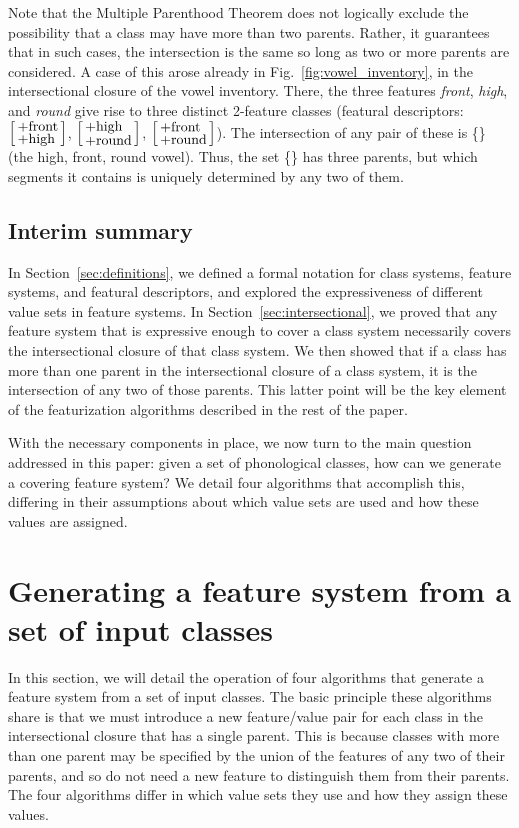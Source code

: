 \documentclass[12pt, oneside]{article}   	%
\newcommand{\featmattwo}[2]{$\begin{bsmallmatrix*}[l]\text{\normalsize #1}\\\text{\normalsize #2}\end{bsmallmatrix*}$}
\begin{document}
\vspace{0.5\baselineskip} Note that the Multiple Parenthood Theorem does not logically exclude the possibility that a class may have more than two parents. Rather, it guarantees that in such cases, the intersection is the same so long as two or more parents are considered. A case of this arose already in Fig.~\ref{fig:vowel_inventory}, in the intersectional closure of the vowel inventory. There, the three features \textit{front}, \textit{high}, and \textit{round} give rise to three distinct 2-feature classes (featural descriptors: \featmattwo{+front}{+high}, \featmattwo{+high}{+round}, \featmattwo{+front}{+round}). The intersection of any pair of these is \{\} (the high, front, round vowel). Thus, the set  \{\} has three parents, but which segments it contains is uniquely determined by any two of them.

\subsection{Interim summary}

In Section~\ref{sec:definitions}, we defined a formal notation for class systems, feature systems, and featural descriptors, and explored the expressiveness of different value sets in feature systems. In Section~\ref{sec:intersectional}, we proved that any feature system that is expressive enough to cover a class system necessarily covers the intersectional closure of that class system. We then showed that if a class has more than one parent in the intersectional closure of a class system, it is the intersection of any two of those parents. This latter point will be the key element of the featurization algorithms described in the rest of the paper.

With the necessary components in place, we now turn to the main question addressed in this paper: given a set of phonological classes, how can we generate a covering feature system? We detail four algorithms that accomplish this, differing in their assumptions about which value sets are used and how these values are assigned.

\FloatBarrier
\section{Generating a feature system from a set of input classes}
\label{sec:algorithm_intro}

In this section, we will detail the operation of four algorithms that generate a feature system from a set of input classes. The basic principle these algorithms share is that we must introduce a new feature/value pair for each class in the intersectional closure that has a single parent. This is because classes with more than one parent may be specified by the union of the features of any two of their parents, and so do not need a new feature to distinguish them from their parents. The four algorithms differ in which value sets they use and how they assign these values.
\end{document}
